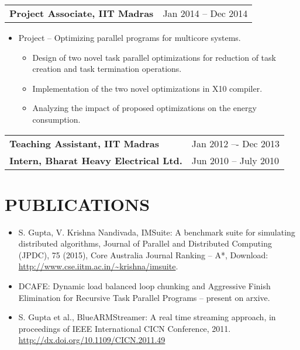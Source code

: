 \documentclass[10pt]{article}
\begin{document}
{\setlength{\tabcolsep}{60pt}
\hspace{-2.6cm}
\begin{tabular}{ll}
{\bf Project Associate, IIT Madras}			& Jan 2014 -- Dec 2014	\\
\end{tabular}
}
\vspace{-0.6cm}
\begin{itemize}
\item Project – Optimizing parallel programs for multicore systems.
	\vspace{-0.2cm}
	\begin{itemize}
	\itemsep-0.2em
	\item Design of two novel task parallel optimizations for reduction of
		task creation and task termination operations.
	\item Implementation of the two novel optimizations in X10 compiler.
	\item Analyzing the impact of proposed optimizations on the energy consumption.
	\end{itemize}
\end{itemize}


{\setlength{\tabcolsep}{45pt}
\hspace{-2.1cm}
\begin{tabular}{ll}
{\bf Teaching Assistant, IIT Madras}			& Jan 2012 –- Dec 2013	\\
{\bf Intern, Bharat Heavy Electrical Ltd.}		& Jun 2010 – July 2010	\\
\end{tabular}
}



\section*{PUBLICATIONS}
\begin{itemize}
\itemsep-0.2em
\item S. Gupta, V. Krishna Nandivada, IMSuite: A benchmark suite for simulating distributed algorithms, Journal of Parallel and Distributed Computing (JPDC), 75 (2015), Core Australia Journal Ranking – A*, 
Download: \url{http://www.cse.iitm.ac.in/~krishna/imsuite}.

\item DCAFE: Dynamic load balanced loop chunking and Aggressive Finish Elimination for
Recursive Task Parallel Programs – present on arxive.

\item S. Gupta et al., BlueARMStreamer: A real time streaming approach, in proceedings of
IEEE International CICN Conference, 2011. \url{http://dx.doi.org/10.1109/CICN.2011.49}
\end{itemize}
\end{document}
